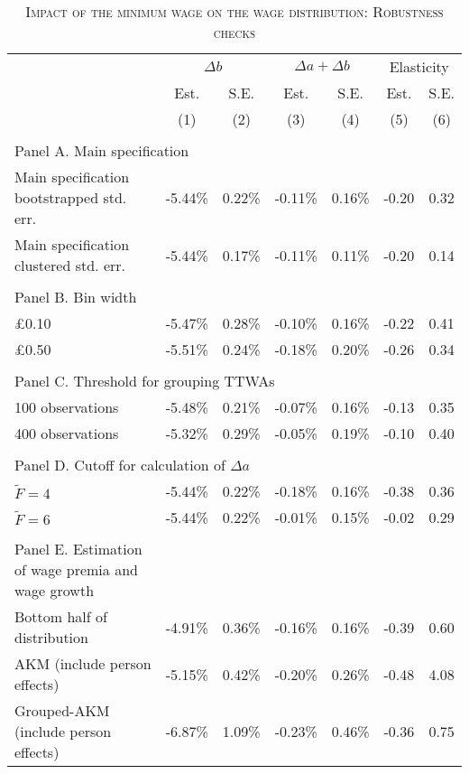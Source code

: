 \begin{table}[pth]
\centering
\small
\caption{\textsc{Impact of the minimum wage on the wage distribution: Robustness checks}}
\label{tab:robustness}
\begin{threeparttable}
\begin{tabular}{lcccccc}
\toprule
 & \multicolumn{2}{c}{$\Delta{b}$} & \multicolumn{2}{c}{$\Delta{a}+\Delta{b}$} & \multicolumn{2}{c}{Elasticity} \\
 & Est. & S.E. & Est. & S.E. & Est. & S.E. \\
 & (1) & (2) & (3) & (4) & (5) & (6) \\
\midrule
& \\
\multicolumn{7}{l}{Panel A. Main specification} \\
Main specification bootstrapped std. err. & -5.44\% & 0.22\% & -0.11\% & 0.16\% & -0.20 & 0.32 \\
Main specification clustered std. err. & -5.44\% & 0.17\% & -0.11\% & 0.11\% & -0.20 & 0.14 \\
\\
\multicolumn{7}{l}{Panel B. Bin width} \\
\pounds 0.10 & -5.47\% & 0.28\% & -0.10\% & 0.16\% & -0.22 & 0.41 \\
\pounds 0.50 & -5.51\% & 0.24\% & -0.18\% & 0.20\% & -0.26 & 0.34 \\
\\
\multicolumn{7}{l}{Panel C. Threshold for grouping TTWAs} \\
100 observations & -5.48\% & 0.21\% & -0.07\% & 0.16\% & -0.13 & 0.35 \\
400 observations & -5.32\% & 0.29\% & -0.05\% & 0.19\% & -0.10 & 0.40 \\
\\
\multicolumn{7}{l}{Panel D. Cutoff for calculation of $\Delta{a}$} \\
$\tilde{F} = 4$ & -5.44\% & 0.22\% & -0.18\% & 0.16\% & -0.38 & 0.36 \\
$\tilde{F} = 6$ & -5.44\% & 0.22\% & -0.01\% & 0.15\% & -0.02 & 0.29 \\
\\
\multicolumn{1}{l}{Panel E. Estimation of wage premia and wage growth} &&&&&& \\
Bottom half of distribution & -4.91\% & 0.36\% & -0.16\% & 0.16\% & -0.39 & 0.60 \\
AKM (include person effects) & -5.15\% & 0.42\% & -0.20\% & 0.26\% & -0.48 & 4.08 \\
Grouped-AKM (include person effects) & -6.87\% & 1.09\% & -0.23\% & 0.46\% & -0.36 & 0.75 \\

\end{tabular}
\end{threeparttable}
\end{table}
